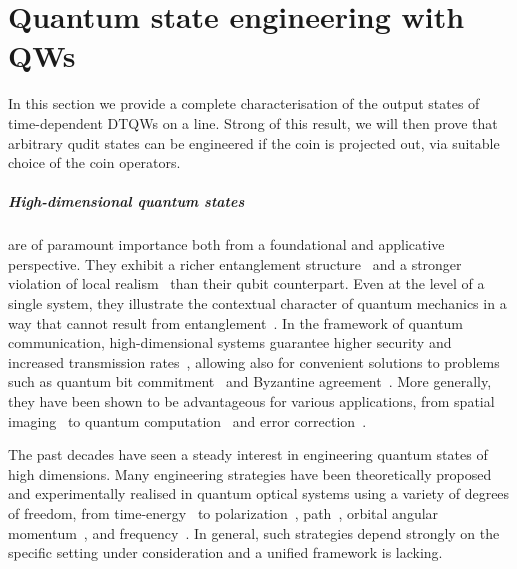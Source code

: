 
\chapter{Quantum state engineering with QWs}
\label{sec:quantum_walks}

In this section we provide a complete characterisation of the output states of time-dependent \acp{DTQW} on a line. Strong of this result, we will then prove that arbitrary qudit states can be engineered if the coin is projected out, via suitable choice of the coin operators.

\paragraph{High-dimensional quantum states}
are of paramount importance both from a foundational and applicative perspective. They exhibit a richer entanglement structure~\cite{horodecki2009quantum} and a stronger violation of local realism~\cite{brunner2014bell} than their qubit counterpart. Even at the level of a single system, they illustrate the contextual character of quantum mechanics in a way that cannot result from entanglement~\cite{lapkiewicz2011experimental}. 
In the framework of quantum communication, high-dimensional systems guarantee higher security and increased transmission rates~\cite{bechmannpasquinucci2000quantum, cerf2002security, bru2002optimal, acin2003security, karimipour2002quantum, durt2004security, nunn2013largealphabet, mower2013highdimensional, lee2014entanglementbased, zhong2015photonefficient}, allowing also for convenient solutions to problems such as quantum bit commitment~\cite{langford2004measuring} and  Byzantine agreement~\cite{fitzi2001quantum}.
More generally, they have been shown to be advantageous for various applications,
from spatial imaging~\cite{howland2013efficient} to quantum computation~\cite{bartlett2002quantum, ralph2007efficient} and error correction~\cite{campbell2012magicstate}.

The past decades have seen a steady interest in engineering quantum states of high dimensions. %
Many engineering strategies have been theoretically proposed and experimentally realised in quantum optical systems using a variety of degrees of freedom, from time-energy~\cite{thew2004belltype, bessire2014versatile} to polarization~\cite{bogdanov2004qutrit}, path~\cite{osullivanhale2005pixel}, orbital angular momentum~\cite{mair2001entanglement, mclaren2012entangled, krenn2013entangled, krenn2014generation, zhang2016engineering}, and frequency~\cite{bernhard2013shaping, jin2016simple}. In general, such strategies depend strongly on the specific setting under consideration and a unified framework is lacking. 

